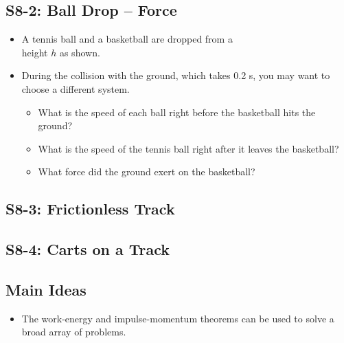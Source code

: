\documentclass[]{article}
\begin{document}
\begin{PresentSpace}
\vspace{-10pt}
\section*{S8-2: Ball Drop -- Force}
\vspace{-10pt}
\begin{itemize}
	\item A tennis ball and a basketball are dropped from a \\
	height $h$ as shown.
	\item During the collision with the ground, which takes 0.2 s, you may want to choose a different system.
	\begin{itemize}
		\item What is the speed of each ball right before the basketball hits the ground?
		\item What is the speed of the tennis ball right after it leaves the basketball?
		\item What force did the ground exert on the basketball?
	\end{itemize}
\end{itemize}
\end{PresentSpace}
\newpage
\begin{TeacherMargin}

\end{TeacherMargin}
\begin{PresentSpace}
\vspace{-10pt}
\section*{S8-3: Frictionless Track}
\vspace{-10pt}

\end{PresentSpace}
\newpage
\begin{TeacherMargin}

\end{TeacherMargin}
\begin{PresentSpace}
\vspace{-10pt}
\section*{S8-4: Carts on a Track}
\vspace{-10pt}

\end{PresentSpace}
\newpage
\begin{TeacherMargin}

\end{TeacherMargin}
\begin{PresentSpace}
\section*{Main Ideas}
\begin{itemize}
	\item The work-energy and impulse-momentum theorems can be used to solve a broad array of problems.
\end{itemize}
\end{PresentSpace}
\end{document}
